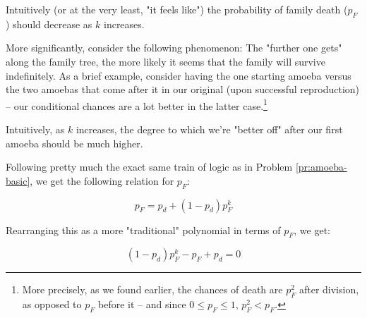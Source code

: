 Intuitively (or at the very least, "it feels like") the probability of family death ($p_F$) should decrease as $k$ increases.

More significantly, consider the following phenomenon: The "further one gets" along the family tree, the more likely it seems that the family will survive indefinitely. As a brief example, consider having the one starting amoeba versus the two amoebas that come after it in our original (upon successful reproduction) -- our conditional chances are a lot better in the latter case.\footnote{More precisely, as we found earlier, the chances of death are $p_F^2$ after division, as opposed to $p_F$ before it -- and since $0 \leq p_F \leq 1$, $p_F^2 < p_F$.}

Intuitively, as $k$ increases, the degree to which we're "better off" after our first amoeba should be much higher. 


Following pretty much the exact same train of logic as in Problem \ref{pr:amoeba-basic}, we get the following relation for $p_F$:

\begin{equation}
p_F = p_d + (1-p_d)p_F^k
\end{equation}

Rearranging this as a more "traditional" polynomial in terms of $p_F$, we get:

\begin{equation}
(1-p_d)p_F^k - p_F + p_d = 0
\end{equation}





